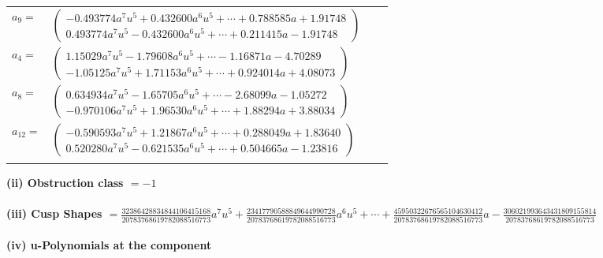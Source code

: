 \documentclass[1p]{elsarticle_modified}
\theoremstyle{definition}
\begin{document}
\begin{tabular}{m{7pt} m{180pt} m{7pt} m{180pt} }
\flushright $a_{9}=$&$\begin{pmatrix}-0.493774 a^{7} u^{5}+0.432600 a^{6} u^{5}+\cdots+0.788585 a+1.91748\\0.493774 a^{7} u^{5}-0.432600 a^{6} u^{5}+\cdots+0.211415 a-1.91748\end{pmatrix}$ \\
\flushright $a_{4}=$&$\begin{pmatrix}1.15029 a^{7} u^{5}-1.79608 a^{6} u^{5}+\cdots-1.16871 a-4.70289\\-1.05125 a^{7} u^{5}+1.71153 a^{6} u^{5}+\cdots+0.924014 a+4.08073\end{pmatrix}$ \\
\flushright $a_{8}=$&$\begin{pmatrix}0.634934 a^{7} u^{5}-1.65705 a^{6} u^{5}+\cdots-2.68099 a-1.05272\\-0.970106 a^{7} u^{5}+1.96530 a^{6} u^{5}+\cdots+1.88294 a+3.88034\end{pmatrix}$ \\
\flushright $a_{12}=$&$\begin{pmatrix}-0.590593 a^{7} u^{5}+1.21867 a^{6} u^{5}+\cdots+0.288049 a+1.83640\\0.520280 a^{7} u^{5}-0.621535 a^{6} u^{5}+\cdots+0.504665 a-1.23816\end{pmatrix}$\\&\end{tabular}
\flushleft \textbf{(ii) Obstruction class $= -1$}\\~\\
\flushleft \textbf{(iii) Cusp Shapes $= \frac{32386428834844106415168}{20783768619782088516773} a^7 u^5+\frac{23417790588849644990728}{20783768619782088516773} a^6 u^5+\cdots+\frac{45950322676565104630412}{20783768619782088516773} a-\frac{306021993643431809155814}{20783768619782088516773}$}\\~\\
\newpage\renewcommand{\arraystretch}{1}
\flushleft \textbf{(iv) u-Polynomials at the component}\newline \\
\end{document}
